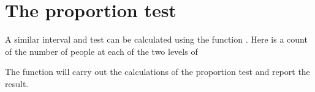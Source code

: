 \section{The proportion test}

A similar interval and test can be calculated using the function .
%
%
Here is a count of the number of people at each of the two levels of 

\begin{knitrout}
\color{fgcolor}\begin{kframe}
\begin{alltt}
\hlstd{(}\hlopt{~}  
\end{alltt}


{\ttfamily\noindent\bfseries{}}\end{kframe}
\end{knitrout}

The  function will carry out the calculations of the proportion test and report the result.

\hfill

